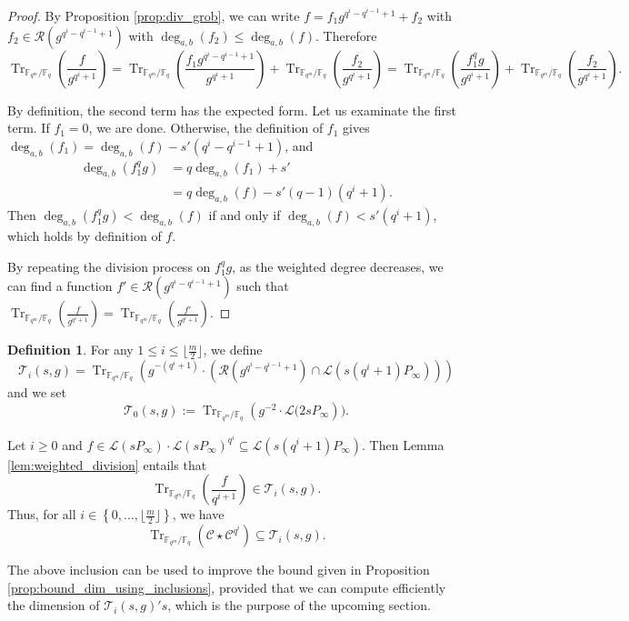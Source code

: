 \documentclass[a4paper]{article}
\theoremstyle{definition}
\newtheorem{definition}[thm]{Definition}
\theoremstyle{remark}
\newcommand{\calL}{\mathcal{L}}
\newcommand{\calC}{\mathcal{C}}
\newcommand{\calR}{\mathcal{R}}
\newcommand{\calT}{\mathcal{T}}
\newcommand{\fq}{\mathbb{F}_{q}}
\newcommand{\Tr}[1]{\operatorname{Tr}_{\mathbb{F}_{q^m}/\fq}\left(#1\right)}
\newcommand{\set}[1]{\left\{#1\right\}}
\newcommand{\degab}[1]{\deg_{a,b}\left(#1\right)}
\begin{document}
\begin{proof}

By Proposition \ref{prop:div_grob}, we can write $f=f_1 g^{q^i-q^{i-1}+1} +f_2$ with
	$f_2 \in \calR\left(g^{q^i-q^{i-1}+1}\right)$ with $\degab{f_2} \leq \degab{f}$. Therefore
	\[\Tr{\frac{f}{g^{q^i+1}}}=\Tr{\frac{f_1 g^{q^i-q^{i-1}+1}}{g^{q^i+1}}} +\Tr{\frac{f_2}{g^{q^i+1}}}= \Tr{\frac{f_1^qg}{g^{q^i+1}}} +\Tr{\frac{f_2}{g^{q^i+1}}}. \]
	
	By definition, the second term has the expected form. Let us examinate the first term. If $f_1=0$, we are done. Otherwise, the definition of $f_1$ gives
$\degab{f_1} =\degab{f} - s'(q^i-q^{i-1}+1)$, and
	\begin{align*}
	\degab{f_1^qg} 	&= q \degab{f_1} + s'\\
					&= q\degab{f} - s'(q-1)(q^i+1).
	\end{align*} 
Then  $\degab{f_1^qg} < \degab{f}$ if and only if $\degab{f} < s'(q^i+1)$, which holds by definition of $f$.

By repeating the division process on $f_1^qg$, as the weighted degree decreases, we can find a function $f' \in \calR\left(g^{q^i-q^{i-1}+1}\right)$ such that $\Tr{\frac{f}{g^{q^i+1}}} = \Tr{\frac{f'}{g^{q^i+1}}} $.

\end{proof}

\begin{definition} \label{def:T_i's}
For any $1 \leq i \leq \lfloor\frac{m}{2}\rfloor$, we define
$$\calT_i(s,g)= \Tr{g^{-(q^i+1)}\cdot \left( \calR\left(g^{q^i-q^{i-1}+1}\right)  \cap \calL(s(q^i+1)P_\infty)\right)}$$
and we set $$\calT_0(s,g) := \Tr{g^{-2} \cdot \calL(2sP_\infty}).$$
\end{definition}


\noindent Let $i \geq 0$ and $f \in \calL(sP_\infty) \cdot \calL(sP_\infty)^{q^i} \subseteq \calL(s(q^i+1)P_\infty)$. Then 
Lemma \ref{lem:weighted_division} entails that 
$$\Tr{\dfrac{f}{q^{i+1}}} \in \calT_i(s,g).$$
Thus, for all $i \in \set{0,\dots,\lfloor \frac{m}{2} \rfloor}$, we have \begin{equation} \label{eq:Tr(C*C^q^i)_dans_T_i}
\Tr{\calC \star \calC^{q^i}} \subseteq \calT_i(s,g).
\end{equation}

\noindent The above inclusion can be used to improve the bound given in Proposition \ref{prop:bound_dim_using_inclusions}, provided that we can compute efficiently the dimension of $\calT_i(s,g)'s$, which is the purpose of the upcoming section.
\end{document}
